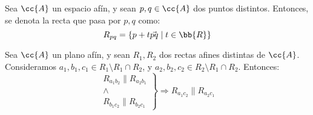 \begin{notacion}
    Sea $\cc{A}$ un espacio afín, y sean $p,q\in \cc{A}$ dos puntos distintos. Entonces, se denota la recta que pasa por $p,q$ como:
    \begin{equation*}
        R_{pq} = \{p+t\vec{pq}\mid t\in \bb{R}\}
    \end{equation*}
\end{notacion}
\begin{teo}
    Sea $\cc{A}$ un plano afín, y sean $R_1, R_2$ dos rectas afines distintas de $\cc{A}$.
    Consideramos $a_1,b_1,c_1\in R_1\setminus R_1\cap R_2$, y $a_2,b_2,c_2\in R_2\setminus R_1\cap R_2$. Entonces:
    \begin{equation*}
        \left.
            \begin{array}{c}
                R_{a_1b_2} \| R_{a_2b_1} \\ \land \\ R_{b_1c_2} \| R_{b_2c_1}
            \end{array} 
        \right\} \Longrightarrow R_{a_1c_2} \| R_{a_2c_1}
    \end{equation*}
\end{teo}
